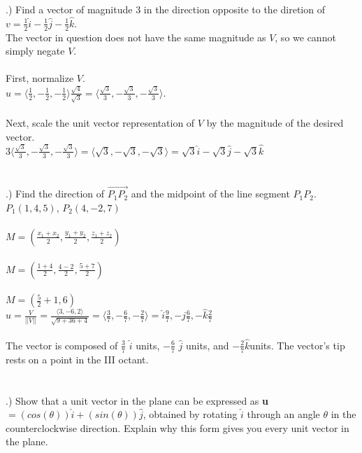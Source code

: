 \documentclass[12pt]{article}
\begin{document}
.) Find a vector of magnitude 3 in the direction opposite to the diretion of $v = \frac{1}{2}\hat{i} - \frac{1}{2}\hat{j} -\frac{1}{2}\hat{k}$.\\
The vector in question does not have the same magnitude as $V$, so we cannot simply negate $V$. \\\\
First, normalize $V$.\\ $u = \langle \frac{1}{2} , -\frac{1}{2} , -\frac{1}{2} \rangle \frac{\sqrt{4}}{\sqrt{3}} = \langle \frac{\sqrt{3}}{3}, -\frac{\sqrt{3}}{3}, -\frac{\sqrt{3}}{3} \rangle$.\\\\
Next, scale the unit vector representation of $V$ by the magnitude of the desired vector.\\
$3\langle \frac{\sqrt{3}}{3}, -\frac{\sqrt{3}}{3}, -\frac{\sqrt{3}}{3} \rangle =  \langle \sqrt{3}, -\sqrt{3}, -\sqrt{3} \rangle =  \sqrt{3}\hat{i} -\sqrt{3} \hat{j}-\sqrt{3}\hat{k} $\\\\\\

.) Find the direction of $\vec{P_{1}P_{2}}$ and the midpoint of the line segment $P_{1}P_{2}$.\\
$P_{1}(1, 4, 5)$, \hspace{10pt} $P_{2}(4, -2,  7)$\\\\
$M = (\frac{x_{1} + x_{2}}{2} , \frac{y_{1}+y_{2}}{2} , \frac{z_{1}+z_{2}}{2})$\\\\
$M = (\frac{1 + 4}{2} , \frac{4-2}{2} , \frac{5+7}{2})$\\\\
$M = (\frac{5}{2} + 1 , 6)$\\
\noindent $u = \frac{V}{||V||} = \frac{\langle 3, -6, 2 \rangle}{\sqrt{9 + 36 + 4}} = \langle \frac{3}{7}, -\frac{6}{7}, -\frac{2}{7} \rangle = \hat{i}\frac{9}{7}, -\hat{j}\frac{6}{7}, -\hat{k}\frac{2}{7}$\\\\
The vector is composed of $\frac{3}{7}$ $\hat{i}$ units, $-\frac{6}{7}$ $\hat{j}$ units, and $-\frac{2}{7}\hat{k}$units. The vector's tip rests on a point in the III octant.\\\\\\


.) Show that a unit vector in the plane can be expressed as \textbf{u} $= (cos(\theta))\hat{i} + (sin(\theta))\hat{j}$, obtained by 
rotating $\hat{i}$ through an angle $\theta$ in the counterclockwise direction. Explain why this form gives you every unit vector in the plane.\\\\
\end{document}
